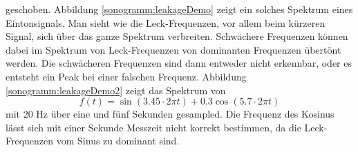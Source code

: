 geschoben.
Abbildung \ref{sonogramm:leakageDemo} zeigt ein solches Spektrum eines Eintonsignals.
Man sieht wie die Leck-Frequenzen, vor allem beim kürzeren Signal,
sich über das ganze Spektrum verbreiten.
Schwächere Frequenzen können dabei im Spektrum von Leck-Frequenzen von dominanten Frequenzen
übertönt werden.
Die schwächeren Frequenzen sind dann entweder nicht erkennbar, oder es entsteht ein Peak 
bei einer falschen Frequenz. 
Abbildung \ref{sonogramm:leakageDemo2} zeigt das Spektrum von 
\begin{equation}
    f(t) = \sin(3.45\cdot 2\pi t) + 0.3  \cos(5.7\cdot  2\pi t)
\label{sonogramm:eq:sigLeck}
\end{equation}
mit 20 Hz über eine und fünf Sekunden gesampled.
Die Frequenz des Kosinus lässt sich mit einer Sekunde Messzeit nicht korrekt bestimmen, 
da die Leck-Frequenzen vom Sinus zu dominant sind.

